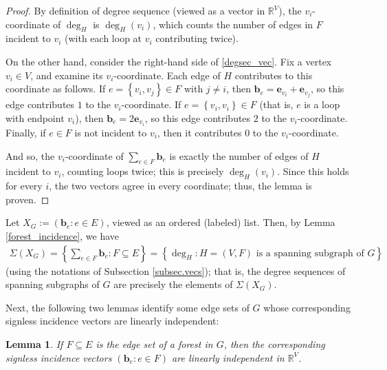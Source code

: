 \documentclass[12pt]{article}
\newtheorem{lemma}[theorem]{Lemma}
\theoremstyle{definition}
\theoremstyle{remark}
\newcommand{\set}[1]{\left\{ #1 \right\}}
\newcommand{\tup}[1]{\left( #1 \right)}
\begin{document}
\begin{proof}
    By definition of degree sequence (viewed as a vector in $\mathbb{R}^V$), the $v_i$-coordinate of $\deg_H$ is $\deg_H(v_i)$, which counts the number of edges in $F$ incident to $v_i$ (with each loop at $v_i$ contributing twice).

    On the other hand, consider the right-hand side of \eqref{degsec_vec}. Fix a vertex $v_i \in V$, and examine its $v_i$-coordinate. Each edge of $H$ contributes to this coordinate as follows. If $e = \set{v_i,v_j} \in F$ with $j \neq i$, then $\mathbf{b}_e = \mathbf{e}_{v_i}+\mathbf{e}_{v_j}$, so this edge contributes $1$ to the $v_i$-coordinate. If $e = \set{v_i,v_i} \in F$ (that is, $e$ is a loop with endpoint $v_i$), then $\mathbf{b}_e = 2\mathbf{e}_{v_i}$, so this edge contributes $2$ to the $v_i$-coordinate. Finally, if $e \in F$ is not incident to $v_i$, then it contributes $0$ to the $v_i$-coordinate.

    And so, the $v_i$-coordinate of $\sum_{e \in F}\mathbf{b}_e$ is exactly the number of edges of $H$ incident to $v_i$, counting loops twice; this is precisely $\deg_H(v_i)$. Since this holds for every $i$, the two vectors agree in every coordinate; thus, the lemma is proven.
\end{proof}

Let $X_G := \tup{\mathbf{b}_e : e \in E}$, viewed as an ordered (labeled) list. Then, by Lemma \ref{forest_incidence}, we have \begin{align}\label{sum_equals_degs}
    \Sigma(X_G) = \set{\sum_{e \in F}\mathbf{b}_e : F \subseteq E}
    = \set{\deg_H : H=(V,F) \text{ is a spanning subgraph of $G$}}
\end{align} (using the notations of Subsection \ref{subsec.vecs});
that is, the degree sequences of spanning subgraphs of $G$ are precisely the elements of $\Sigma(X_G)$.

Next, the following two lemmas identify some edge sets of $G$ whose corresponding signless incidence vectors are linearly independent:



\begin{lemma}\label{forests_independence}
    If $F \subseteq E$ is the edge set of a forest in $G$, then the corresponding signless incidence vectors $\tup{\mathbf{b}_e : e \in F}$ are linearly independent in $\mathbb{R}^V$.
\end{lemma}
\end{document}
